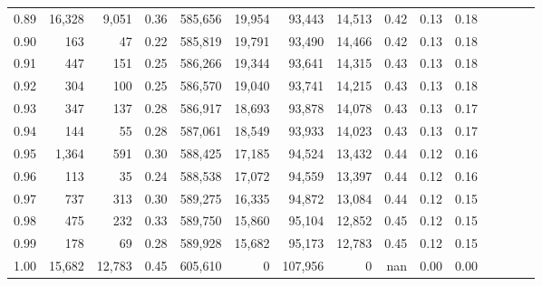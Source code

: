 \begin{tabular}{rrrcrrrrrrrrrrr}
0.89 &  16,328 &   9,051 &                                       0.36 &  585,656 &   19,954 &   93,443 &   14,513 &  0.42 &  0.13 &                         0.18 \\
0.90 &     163 &      47 &                                       0.22 &  585,819 &   19,791 &   93,490 &   14,466 &  0.42 &  0.13 &                         0.18 \\
0.91 &     447 &     151 &                                       0.25 &  586,266 &   19,344 &   93,641 &   14,315 &  0.43 &  0.13 &                         0.18 \\
0.92 &     304 &     100 &                                       0.25 &  586,570 &   19,040 &   93,741 &   14,215 &  0.43 &  0.13 &                         0.18 \\
0.93 &     347 &     137 &                                       0.28 &  586,917 &   18,693 &   93,878 &   14,078 &  0.43 &  0.13 &                         0.17 \\
0.94 &     144 &      55 &                                       0.28 &  587,061 &   18,549 &   93,933 &   14,023 &  0.43 &  0.13 &                         0.17 \\
0.95 &   1,364 &     591 &                                       0.30 &  588,425 &   17,185 &   94,524 &   13,432 &  0.44 &  0.12 &                         0.16 \\
0.96 &     113 &      35 &                                       0.24 &  588,538 &   17,072 &   94,559 &   13,397 &  0.44 &  0.12 &                         0.16 \\
0.97 &     737 &     313 &                                       0.30 &  589,275 &   16,335 &   94,872 &   13,084 &  0.44 &  0.12 &                         0.15 \\
0.98 &     475 &     232 &                                       0.33 &  589,750 &   15,860 &   95,104 &   12,852 &  0.45 &  0.12 &                         0.15 \\
0.99 &     178 &      69 &                                       0.28 &  589,928 &   15,682 &   95,173 &   12,783 &  0.45 &  0.12 &                         0.15 \\
1.00 &  15,682 &  12,783 &                                       0.45 &  605,610 &        0 &  107,956 &        0 &   nan &  0.00 &                         0.00 \\
\bottomrule
\end{tabular}
